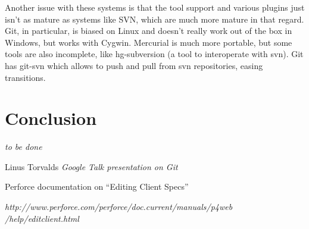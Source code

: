 \documentclass[%
	final,
	notitlepage,
	narroweqnarray,
	inline,
	twoside,
	]{ieee}
\newcommand{\latexiie}{\LaTeX2{\Large$_\varepsilon$}}
\begin{document}
Another issue with these systems is that the tool support and various plugins just isn't as 
mature as systems like SVN, which are much more mature in that regard. Git, in particular, is 
biased on Linux and doesn't really work out of the box in Windows, but works with Cygwin. 
Mercurial is much more portable, but some tools are also incomplete, like hg-subversion (a tool 
to interoperate with svn). Git has git-svn which allows to push and pull from svn repositories, 
easing transitions.


\section{Conclusion}

\emph{to be done}



\begin{thebibliography}{1}

% 

Linus Torvalds
\newblock \emph{Google Talk presentation on Git}

Perforce documentation on ``Editing Client Specs''

\newblock \emph{
http://www.perforce.com/perforce/doc.current/manuals/p4web
/help/editclient.html
}

\end{thebibliography}

\end{document}
